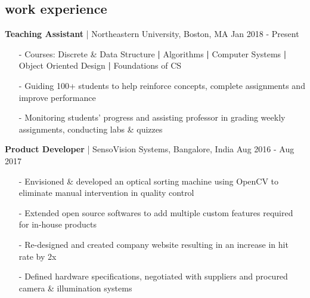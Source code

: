 \documentclass[a4paper, 10pt, oneside]{article}
\newcommand{\bulltetspace}{\vspace{-0.2em}}
\begin{document}
\begin{center}
\vspace{-1.em}
\section{\color{headings}work experience}
\vspace{-0.5em}
\color{headings}\textbf{Teaching Assistant} | Northeastern University, Boston, MA \hfill Jan 2018 - Present
\vspace{-0.3em}
\begin{itemize} 
\bulltetspace
\item[-] Courses: Discrete \& Data Structure \textbf{|} Algorithms \textbf{|}  Computer Systems \textbf{|}  Object Oriented Design \textbf{|} Foundations of CS\\
\bulltetspace
\color{text1}
\item[-] Guiding 100+ students to help reinforce concepts, complete assignments and improve performance\\
\bulltetspace
\item[-] Monitoring students' progress and assisting professor in grading weekly assignments, conducting labs \& quizzes \\
\end{itemize}

\color{headings}\textbf{Product Developer} | SensoVision Systems, Bangalore, India \hfill Aug 2016 - Aug 2017
\vspace{-0.3em}
\color{text1}
\begin{itemize}
\bulltetspace
\item[-] Envisioned \& developed an optical sorting machine using \color{headings}OpenCV to eliminate manual intervention in quality control \\
\bulltetspace
\item[-] Extended open source softwares to add multiple custom features required for in-house products\\
\bulltetspace
\item[-] Re-designed and created company website resulting in an increase in hit rate by 2x\\
\bulltetspace
\item[-] Defined hardware specifications, negotiated with suppliers and procured camera \& illumination systems 

\end{itemize}


\end{center}
\end{document}
